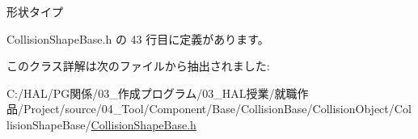 形状タイプ 



 Collision\+Shape\+Base.\+h の 43 行目に定義があります。



このクラス詳解は次のファイルから抽出されました\+:\begin{DoxyCompactItemize}
\item 
C\+:/\+H\+A\+L/\+P\+G関係/03\+\_\+作成プログラム/03\+\_\+\+H\+A\+L授業/就職作品/\+Project/source/04\+\_\+\+Tool/\+Component/\+Base/\+Collision\+Base/\+Collision\+Object/\+Collision\+Shape\+Base/\mbox{\hyperlink{_collision_shape_base_8h}{Collision\+Shape\+Base.\+h}}\end{DoxyCompactItemize}
